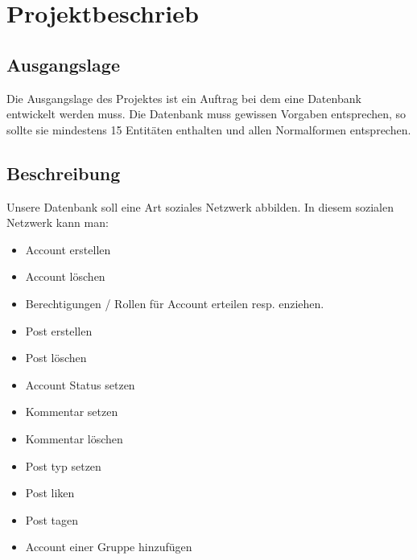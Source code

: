 \documentclass[12pt,twoside,a4paper]{article}
\title{\titleText}
\author{\authorText}
\date{\dateText}
\begin{document}
	\maketitle
	\tableofcontents
	\section {Projektbeschrieb}
	
	\subsection{Ausgangslage}
	
	Die Ausgangslage des Projektes ist ein Auftrag bei dem eine Datenbank entwickelt werden muss. Die Datenbank muss gewissen Vorgaben entsprechen, so sollte sie mindestens 15 Entitäten enthalten und allen Normalformen entsprechen.
	
	\subsection{Beschreibung}
	
	Unsere Datenbank soll eine Art soziales Netzwerk abbilden. In diesem sozialen Netzwerk kann man:
	\begin{itemize}
		\item Account erstellen
		\item Account löschen
		\item Berechtigungen / Rollen für Account erteilen resp. enziehen.
		\item Post erstellen
		\item Post löschen
		\item Account Status setzen
		\item Kommentar setzen
		\item Kommentar löschen
		\item Post typ setzen
		\item Post liken
		\item Post tagen
		\item Account einer Gruppe hinzufügen
		
	\end{itemize}
	
\end{document}
